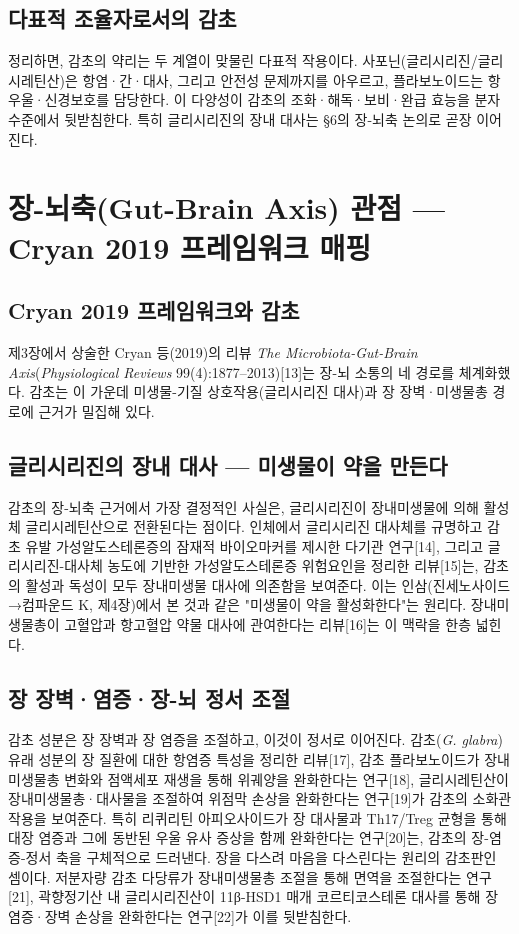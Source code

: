 \documentclass[12pt,oneside]{book}
\begin{document}
\subsection{다표적 조율자로서의 감초}

정리하면, 감초의 약리는 두 계열이 맞물린 다표적 작용이다. 사포닌(글리시리진/글리시레틴산)은 항염·간·대사, 그리고 안전성 문제까지를 아우르고, 플라보노이드는 항우울·신경보호를 담당한다. 이 다양성이 감초의 조화·해독·보비·완급 효능을 분자 수준에서 뒷받침한다. 특히 글리시리진의 장내 대사는 §6의 장-뇌축 논의로 곧장 이어진다.

\section{장-뇌축(Gut-Brain Axis) 관점 — Cryan 2019 프레임워크 매핑}

\subsection{Cryan 2019 프레임워크와 감초}

제3장에서 상술한 Cryan 등(2019)의 리뷰 \textit{The Microbiota-Gut-Brain Axis}(\textit{Physiological Reviews} 99(4):1877–2013)[13]는 장-뇌 소통의 네 경로를 체계화했다. 감초는 이 가운데 미생물-기질 상호작용(글리시리진 대사)과 장 장벽·미생물총 경로에 근거가 밀집해 있다.

\subsection{글리시리진의 장내 대사 — 미생물이 약을 만든다}

감초의 장-뇌축 근거에서 가장 결정적인 사실은, 글리시리진이 장내미생물에 의해 활성체 글리시레틴산으로 전환된다는 점이다. 인체에서 글리시리진 대사체를 규명하고 감초 유발 가성알도스테론증의 잠재적 바이오마커를 제시한 다기관 연구[14], 그리고 글리시리진-대사체 농도에 기반한 가성알도스테론증 위험요인을 정리한 리뷰[15]는, 감초의 활성과 독성이 모두 장내미생물 대사에 의존함을 보여준다. 이는 인삼(진세노사이드→컴파운드 K, 제4장)에서 본 것과 같은 "미생물이 약을 활성화한다"는 원리다. 장내미생물총이 고혈압과 항고혈압 약물 대사에 관여한다는 리뷰[16]는 이 맥락을 한층 넓힌다.

\subsection{장 장벽·염증·장-뇌 정서 조절}

감초 성분은 장 장벽과 장 염증을 조절하고, 이것이 정서로 이어진다. 감초(\textit{G. glabra}) 유래 성분의 장 질환에 대한 항염증 특성을 정리한 리뷰[17], 감초 플라보노이드가 장내미생물총 변화와 점액세포 재생을 통해 위궤양을 완화한다는 연구[18], 글리시레틴산이 장내미생물총·대사물을 조절하여 위점막 손상을 완화한다는 연구[19]가 감초의 소화관 작용을 보여준다. 특히 리퀴리틴 아피오사이드가 장 대사물과 Th17/Treg 균형을 통해 대장 염증과 그에 동반된 우울 유사 증상을 함께 완화한다는 연구[20]는, 감초의 장-염증-정서 축을 구체적으로 드러낸다. 장을 다스려 마음을 다스린다는 원리의 감초판인 셈이다. 저분자량 감초 다당류가 장내미생물총 조절을 통해 면역을 조절한다는 연구[21], 곽향정기산 내 글리시리진산이 11β-HSD1 매개 코르티코스테론 대사를 통해 장 염증·장벽 손상을 완화한다는 연구[22]가 이를 뒷받침한다.
\end{document}
